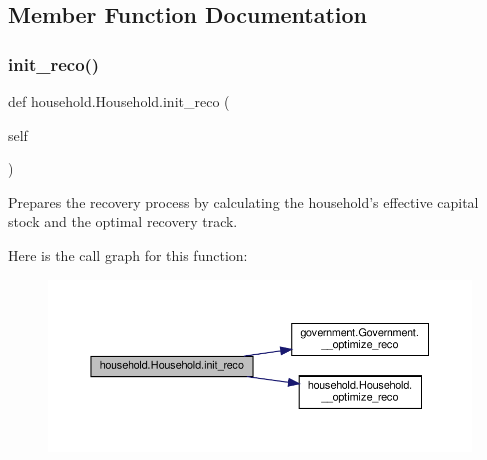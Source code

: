 \subsection{Member Function Documentation}
\mbox{\label{classhousehold_1_1Household_af60008bacefd13fc398091bc7fc06f05}} 
\subsubsection{\texorpdfstring{init\+\_\+reco()}{init\_reco()}}
{\footnotesize\ttfamily def household.\+Household.\+init\+\_\+reco (\begin{DoxyParamCaption}\item[{}]{self }\end{DoxyParamCaption})}

\begin{DoxyVerb}Prepares the recovery process by calculating the household's effective capital stock and
the optimal recovery track.
\end{DoxyVerb}
 Here is the call graph for this function\+:\nopagebreak
\begin{figure}[H]
\begin{center}
\leavevmode
\includegraphics[width=350pt]{classhousehold_1_1Household_af60008bacefd13fc398091bc7fc06f05_cgraph}
\end{center}
\end{figure}
\mbox{\label{classhousehold_1_1Household_ab9aa47f8e64ddaf4825c90c1832b3ddd}} 
